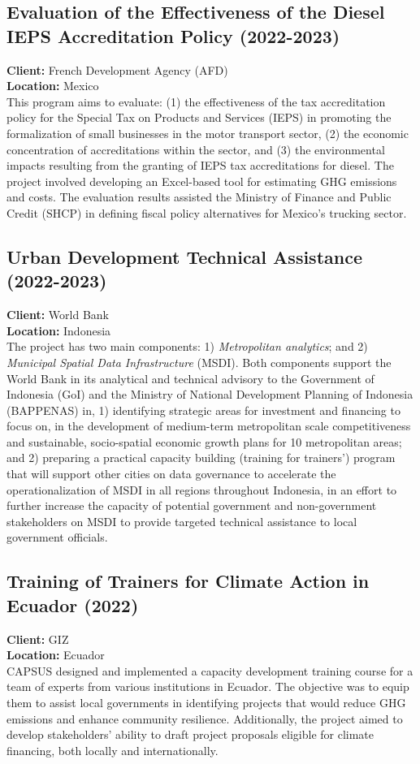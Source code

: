 \documentclass[
	a4paper,
	12pt,
	unnumberedsections,
]{CSSullivanBusinessReport}
\begin{document}
\subsection{Evaluation of the Effectiveness of the Diesel IEPS Accreditation Policy (2022-2023)}
\textbf{Client:}  French Development Agency (AFD) \\
\textbf{Location:}  Mexico \\[0.5em]
 This program aims to evaluate: (1) the effectiveness of the tax accreditation policy for the Special Tax on Products and Services (IEPS) in promoting the formalization of small businesses in the motor transport sector, (2) the economic concentration of accreditations within the sector, and (3) the environmental impacts resulting from the granting of IEPS tax accreditations for diesel. The project involved developing an Excel-based tool for estimating GHG emissions and costs. The evaluation results assisted the Ministry of Finance and Public Credit (SHCP) in defining fiscal policy alternatives for Mexico's trucking sector.

\subsection{Urban Development Technical Assistance (2022-2023)}
\textbf{Client:}  World Bank \\
\textbf{Location:}  Indonesia \\[0.5em]
 The project has two main components: 1) \textit{Metropolitan analytics}; and 2) \textit{Municipal Spatial Data Infrastructure} (MSDI). Both components support the World Bank in its analytical and technical advisory to the Government of Indonesia (GoI) and the Ministry of National Development Planning of Indonesia (BAPPENAS) in, 1) identifying strategic areas for investment and financing to focus on, in the development of medium-term metropolitan scale competitiveness and sustainable, socio-spatial economic growth plans for 10 metropolitan areas; and 2) preparing a practical capacity building (training for trainers’) program that will support other cities on data governance to accelerate the operationalization of MSDI in all regions throughout Indonesia, in an effort to further increase the capacity of potential government and non-government stakeholders on MSDI to provide targeted technical assistance to local government officials.

\subsection{Training of Trainers for Climate Action in Ecuador (2022)}
\textbf{Client:}  GIZ \\
\textbf{Location:}  Ecuador \\[0.5em]
 CAPSUS designed and implemented a capacity development training course for a team of experts from various institutions in Ecuador. The objective was to equip them to assist local governments in identifying projects that would reduce GHG emissions and enhance community resilience. Additionally, the project aimed to develop stakeholders' ability to draft project proposals eligible for climate financing, both locally and internationally.
\end{document}
